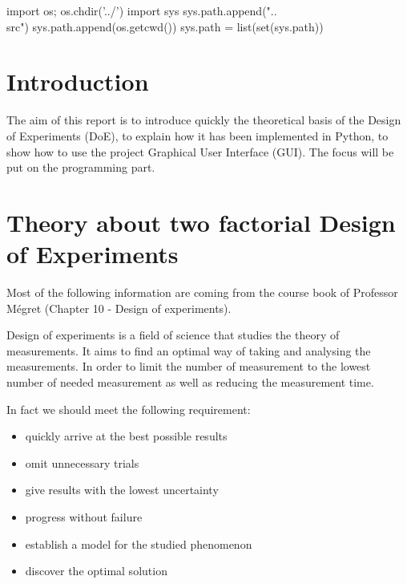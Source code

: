 \documentclass[english, 12 pt, openany, oneside]{book}
\begin{document}
\begin{pyconcode}
import os;
os.chdir('../')
import sys
sys.path.append("..\\src")
sys.path.append(os.getcwd())
sys.path = list(set(sys.path))
\end{pyconcode}

\umonsCoverPage

\frontmatter
\tableofcontents


\mainmatter
{}
\chapter*{Introduction}
The aim of this report is to introduce quickly the theoretical basis of the Design of Experiments (DoE), to explain how it has been implemented in Python, to show how to use the project Graphical User Interface (GUI). The focus will be put on the programming part.

\chapter{Theory about two factorial Design of Experiments}
Most of the following information are coming from the course book of Professor Mégret (Chapter 10 - Design of experiments).

Design of experiments is a field of science that studies the theory of measurements. It aims to find an optimal way of taking and analysing the measurements. In order to limit the number of measurement to the lowest number of needed measurement as well as reducing the measurement time.

In fact we should meet the following requirement:

\begin{itemize}
\item quickly arrive at the best possible results
\item omit unnecessary trials
\item give results with the lowest uncertainty
\item progress without failure
\item establish a model for the studied phenomenon
\item  discover the optimal solution
\end{itemize}
\end{document}

